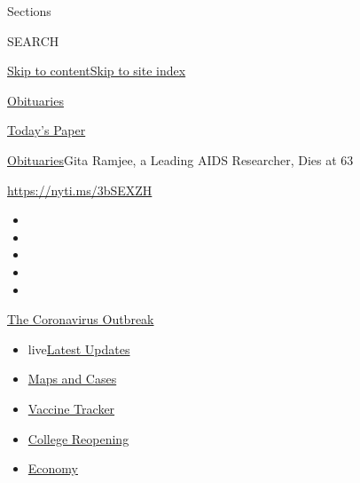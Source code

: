 Sections

SEARCH

\protect\hyperlink{site-content}{Skip to
content}\protect\hyperlink{site-index}{Skip to site index}

\href{https://www.nytimes.com/section/obituaries}{Obituaries}

\href{https://myaccount.nytimes.com/auth/login?response_type=cookie\&client_id=vi}{}

\href{https://www.nytimes.com/section/todayspaper}{Today's Paper}

\href{/section/obituaries}{Obituaries}\textbar{}Gita Ramjee, a Leading
AIDS Researcher, Dies at 63

\url{https://nyti.ms/3bSEXZH}

\begin{itemize}
\item
\item
\item
\item
\item
\end{itemize}

\href{https://www.nytimes.com/news-event/coronavirus?action=click\&pgtype=Article\&state=default\&region=TOP_BANNER\&context=storylines_menu}{The
Coronavirus Outbreak}

\begin{itemize}
\tightlist
\item
  live\href{https://www.nytimes.com/2020/08/03/world/coronavirus-covid-19.html?action=click\&pgtype=Article\&state=default\&region=TOP_BANNER\&context=storylines_menu}{Latest
  Updates}
\item
  \href{https://www.nytimes.com/interactive/2020/us/coronavirus-us-cases.html?action=click\&pgtype=Article\&state=default\&region=TOP_BANNER\&context=storylines_menu}{Maps
  and Cases}
\item
  \href{https://www.nytimes.com/interactive/2020/science/coronavirus-vaccine-tracker.html?action=click\&pgtype=Article\&state=default\&region=TOP_BANNER\&context=storylines_menu}{Vaccine
  Tracker}
\item
  \href{https://www.nytimes.com/2020/08/02/us/covid-college-reopening.html?action=click\&pgtype=Article\&state=default\&region=TOP_BANNER\&context=storylines_menu}{College
  Reopening}
\item
  \href{https://www.nytimes.com/live/2020/08/03/business/stock-market-today-coronavirus?action=click\&pgtype=Article\&state=default\&region=TOP_BANNER\&context=storylines_menu}{Economy}
\end{itemize}

